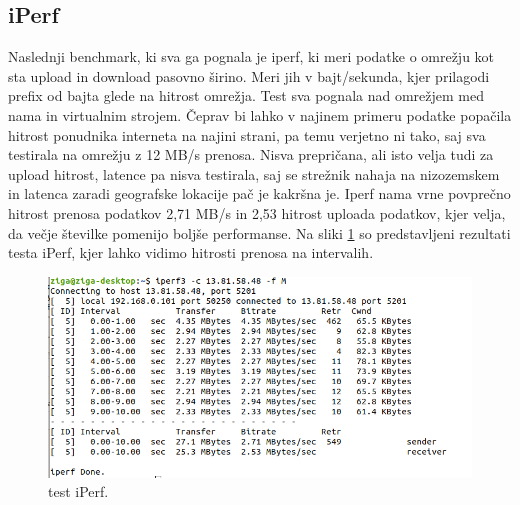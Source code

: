 \subsection{iPerf}
Naslednji benchmark, ki sva ga pognala je iperf, ki meri podatke o omrežju kot sta upload in download pasovno širino. Meri jih v bajt/sekunda, kjer prilagodi prefix od bajta glede na hitrost omrežja. Test sva pognala nad omrežjem med nama in virtualnim strojem. Čeprav bi lahko v najinem primeru podatke popačila hitrost ponudnika interneta na najini strani, pa temu verjetno ni tako, saj sva testirala na omrežju z 12 MB/s prenosa. Nisva prepričana, ali isto velja tudi za upload hitrost, latence pa nisva testirala, saj se strežnik nahaja na nizozemskem in latenca zaradi geografske lokacije pač je kakršna je. Iperf nama vrne povprečno hitrost prenosa podatkov 2,71 MB/s in 2,53 hitrost uploada podatkov, kjer velja, da večje številke pomenijo boljše performanse. Na sliki \ref{fig:4_iperf1} so predstavljeni rezultati testa iPerf, kjer lahko vidimo hitrosti prenosa na intervalih.
\begin{figure}[H]
    \centering
    \includegraphics[scale=0.5]{Img/iperf1.png}
    \caption{test iPerf.}
    \label{fig:4_iperf1}
\end{figure}


